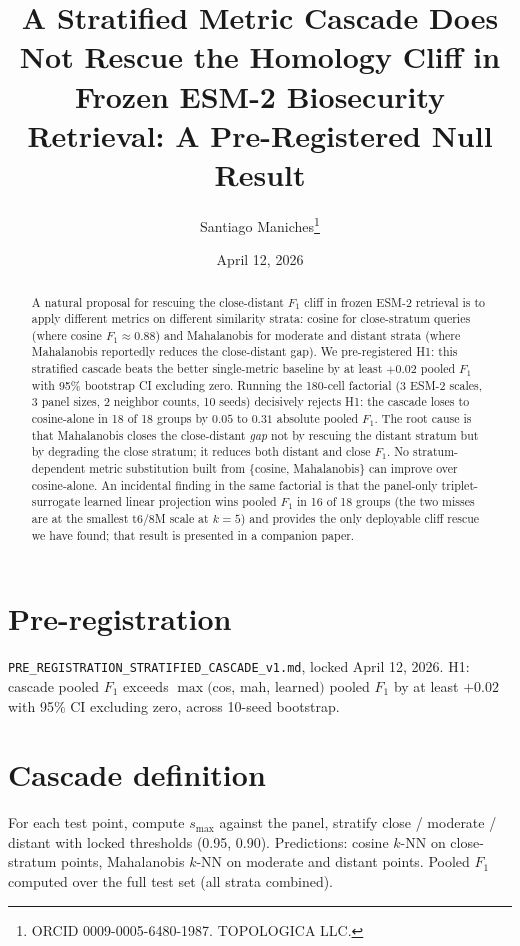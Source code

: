 \documentclass[11pt]{article}
\title{A Stratified Metric Cascade Does Not Rescue the Homology Cliff in Frozen ESM-2 Biosecurity Retrieval: A Pre-Registered Null Result}
\author{Santiago Maniches\thanks{ORCID 0009-0005-6480-1987. TOPOLOGICA LLC.}}
\date{April 12, 2026}
\begin{document}
\maketitle
\begin{abstract}
A natural proposal for rescuing the close-distant $F_1$ cliff in frozen ESM-2 retrieval is to apply different metrics on different similarity strata: cosine for close-stratum queries (where cosine $F_1 \approx 0.88$) and Mahalanobis for moderate and distant strata (where Mahalanobis reportedly reduces the close-distant gap). We pre-registered H1: this stratified cascade beats the better single-metric baseline by at least $+0.02$ pooled $F_1$ with 95\% bootstrap CI excluding zero. Running the 180-cell factorial (3 ESM-2 scales, 3 panel sizes, 2 neighbor counts, 10 seeds) decisively rejects H1: the cascade loses to cosine-alone in 18 of 18 groups by $0.05$ to $0.31$ absolute pooled $F_1$. The root cause is that Mahalanobis closes the close-distant \emph{gap} not by rescuing the distant stratum but by degrading the close stratum; it reduces both distant and close $F_1$. No stratum-dependent metric substitution built from \{cosine, Mahalanobis\} can improve over cosine-alone. An incidental finding in the same factorial is that the panel-only triplet-surrogate learned linear projection wins pooled $F_1$ in 16 of 18 groups (the two misses are at the smallest t6/8M scale at $k=5$) and provides the only deployable cliff rescue we have found; that result is presented in a companion paper.
\end{abstract}

\section{Pre-registration}
\texttt{PRE\_REGISTRATION\_STRATIFIED\_CASCADE\_v1.md}, locked April 12, 2026. H1: cascade pooled $F_1$ exceeds $\max($cos, mah, learned$)$ pooled $F_1$ by at least $+0.02$ with 95\% CI excluding zero, across 10-seed bootstrap.

\section{Cascade definition}
For each test point, compute $s_{\max}$ against the panel, stratify close / moderate / distant with locked thresholds (0.95, 0.90). Predictions: cosine $k$-NN on close-stratum points, Mahalanobis $k$-NN on moderate and distant points. Pooled $F_1$ computed over the full test set (all strata combined).
\end{document}
